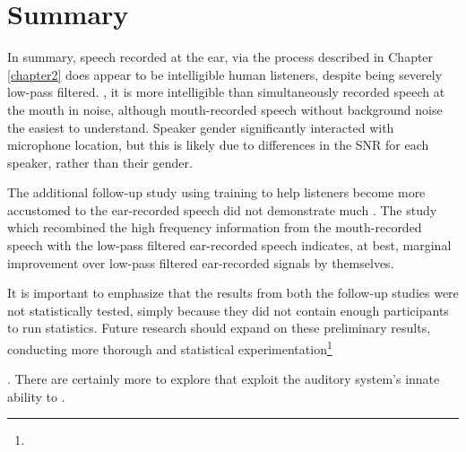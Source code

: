 \DIFdelbegin %
\DIFdelend \DIFaddbegin \section{Summary}
\DIFaddend 

In summary, speech recorded at the ear, via the process described in Chapter \ref{chapter2} does appear to be intelligible \DIFdelbegin {}\DIFdelend \DIFaddbegin {}\DIFaddend human listeners, despite being severely low-pass filtered.  \DIFdelbegin {}\DIFdelend \DIFaddbegin {}\DIFaddend , it is more intelligible than simultaneously recorded speech at the mouth in noise, although mouth-recorded speech without background noise \DIFdelbegin {}\DIFdelend \DIFaddbegin {}\DIFaddend the easiest to understand.  Speaker gender significantly interacted with microphone location, but this is likely due to differences in the SNR for each speaker, rather than their gender.  

The additional follow-up study using training to help listeners become more accustomed to the ear-recorded speech did not demonstrate much \DIFdelbegin {}\DIFdelend \DIFaddbegin {}\DIFaddend .  The study which recombined the high frequency information from the mouth-recorded speech with the low-pass filtered ear-recorded speech indicates, at best, marginal improvement over low-pass filtered ear-recorded signals by themselves.

It is important to emphasize that the results from both the follow-up studies were not statistically tested, simply because they did not contain enough participants to run statistics.  Future research should expand on these preliminary results, conducting more thorough and statistical experimentation\DIFdelbegin \footnote{}%
\addtocounter{footnote}{-1}%
\DIFdelend .  There are certainly more \DIFdelbegin {}\DIFdelend \DIFaddbegin {}\DIFaddend to explore that exploit the auditory system's innate ability to \DIFdelbegin {}\DIFdelend \DIFaddbegin {}\DIFaddend .

